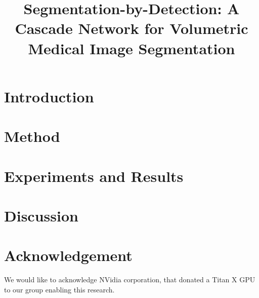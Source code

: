 \documentclass{article}
\title{Segmentation-by-Detection: A Cascade Network for Volumetric Medical Image Segmentation}
\begin{document}
%
\maketitle
%
\begin{abstract}

\end{abstract}
%

%
\section{Introduction}
\label{sec:intro}



\section{Method}
\label{sec:method}



\section{Experiments and Results}
\label{sec:exp}



\section{Discussion}
\label{sec:dis}


\section{Acknowledgement}
\label{sec:ack}
We would like to acknowledge NVidia corporation, that donated a Titan X GPU to our group enabling this research.




\end{document}
